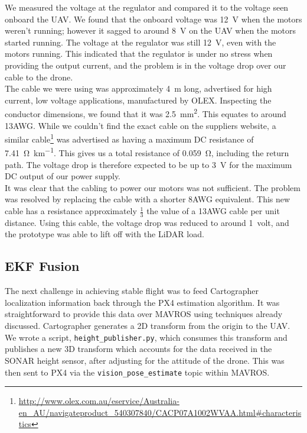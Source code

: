 \documentclass[capstone_report.tex]{subfiles}
\begin{document}
We measured the voltage at the regulator and compared it to the voltage seen onboard the UAV. We found that the onboard voltage was \SI{12}{\volt} when the motors weren't running; however it sagged to around \SI{8}{\volt} on the UAV when the motors started running. The voltage at the regulator was still \SI{12}{\volt}, even with the motors running. This indicated that the regulator is under no stress when providing the output current, and the problem is in the voltage drop over our cable to the drone. \\

The cable we were using was approximately \SI{4}{\meter} long, advertised for high current, low voltage applications, manufactured by OLEX. Inspecting the conductor dimensions, we found that it was \SI{2.5}{\milli\metre\squared}. This equates to around 13AWG. While we couldn't find the exact cable on the suppliers website, a similar cable\footnote{\url{http://www.olex.com.au/eservice/Australia-en_AU/navigateproduct_540307840/CACP07A1002WVAA.html\#characteristics}} was advertised as having a maximum DC resistance of \SI{7.41}{\ohm\per\kilo\metre}. This gives us a total resistance of \SI{0.059}{\ohm}, including the return path. The voltage drop is therefore expected to be up to \SI{3}{\volt} for the maximum DC output of our power supply.\\

It was clear that the cabling to power our motors was not sufficient. The problem was resolved by replacing the cable with a shorter 8AWG equivalent. This new cable has a resistance approximately $\frac{1}{3}$ the value of a 13AWG cable per unit distance. Using this cable, the voltage drop was reduced to around \SI{1}{volt}, and the prototype was able to lift off with the LiDAR load.

\subsection{EKF Fusion}
The next challenge in achieving stable flight was to feed Cartographer localization information back through the PX4 estimation algorithm. It was straightforward to provide this data over MAVROS using techniques already discussed. Cartographer generates a 2D transform from the origin to the UAV. We wrote a script, \texttt{height\_publisher.py}, which consumes this transform and publishes a new 3D transform which accounts for the data received in the SONAR height sensor, after adjusting for the attitude of the drone. This was then sent to PX4 via the \texttt{vision\_pose\_estimate} topic within MAVROS. \\
\end{document}
